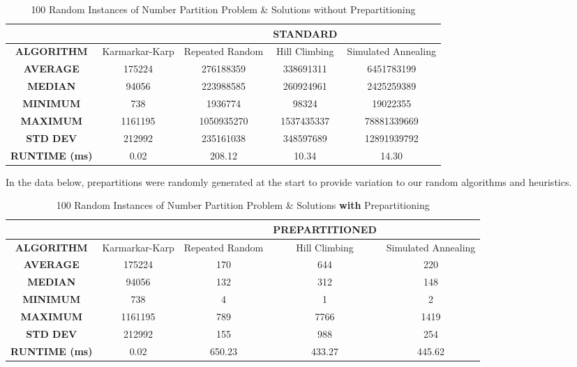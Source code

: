 \documentclass[conference]{styles/acmsiggraph}
\newcommand{\?}{\stackrel{?}{=}}
\begin{document}
\begin{table}[htbp]
  \centering
    \begin{tabular}{c|c|ccc}
\cline{3-5}    \multicolumn{1}{r}{} & \multicolumn{1}{c}{} &       & \textbf{STANDARD} &  \bigstrut\\
    \hline
    \textbf{ALGORITHM} & Karmarkar-Karp & Repeated Random & Hill Climbing & Simulated Annealing \bigstrut\\
    \hline
    \textbf{AVERAGE} & 175224 & 276188359 & 338691311 & 6451783199 \bigstrut[t]\\
    \textbf{MEDIAN} & 94056 & 223988585 & 260924961 & 2425259389 \\
    \textbf{MINIMUM} & 738   & 1936774 & 98324 & 19022355 \\
    \textbf{MAXIMUM} & 1161195 & 1050935270 & 1537435337 & 78881339669 \\
    \textbf{STD DEV} & 212992 & 235161038 & 348597689 & 12891939792 \\
    \textbf{RUNTIME (ms)} & 0.02  & 208.12 & 10.34 & 14.30 \bigstrut[b]\\
    \hline
    \end{tabular}%
    \caption{100 Random Instances of Number Partition Problem \& Solutions without Prepartitioning}
    \label{tab:standardAlgs}%
\end{table}%
\FloatBarrier

In the data below, prepartitions were randomly generated at the start to provide variation to our random algorithms and heuristics.

\begin{table}[htbp]
  \centering
    \begin{tabular}{c|c|ccc}
\cline{3-5}    \multicolumn{1}{r}{} & \multicolumn{1}{r}{} &       & \textbf{PREPARTITIONED} &  \bigstrut\\
    \hline
    \textbf{ALGORITHM} & Karmarkar-Karp & Repeated Random & Hill Climbing & Simulated Annealing \bigstrut\\
    \hline
    \textbf{AVERAGE} & 175224 & 170   & 644   & 220 \bigstrut[t]\\
    \textbf{MEDIAN} & 94056 & 132   & 312   & 148 \\
    \textbf{MINIMUM} & 738   & 4     & 1     & 2 \\
    \textbf{MAXIMUM} & 1161195 & 789   & 7766  & 1419 \\
    \textbf{STD DEV} & 212992 & 155   & 988   & 254 \\
    \textbf{RUNTIME (ms)} & 0.02  & 650.23 & 433.27 & 445.62 \bigstrut[b]\\
    \hline
    \end{tabular}%
    \caption{100 Random Instances of Number Partition Problem \& Solutions \textbf{with} Prepartitioning}
    \label{tab:prepartAlgs}%
\end{table}%
\FloatBarrier
\end{document}
